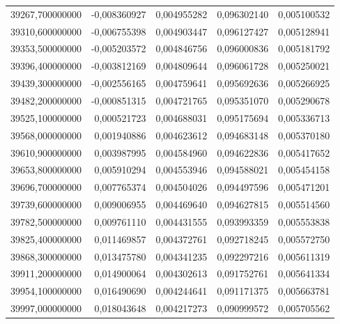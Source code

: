 \begin{longtable}{rrrrr}
39267,700000000 & -0,008360927 & 0,004955282 & 0,096302140 & 0,005100532\\
39310,600000000 & -0,006755398 & 0,004903447 & 0,096127427 & 0,005128941\\
39353,500000000 & -0,005203572 & 0,004846756 & 0,096000836 & 0,005181792\\
39396,400000000 & -0,003812169 & 0,004809644 & 0,096061728 & 0,005250021\\
39439,300000000 & -0,002556165 & 0,004759641 & 0,095692636 & 0,005266925\\
39482,200000000 & -0,000851315 & 0,004721765 & 0,095351070 & 0,005290678\\
39525,100000000 & 0,000521723 & 0,004688031 & 0,095175694 & 0,005336713\\
39568,000000000 & 0,001940886 & 0,004623612 & 0,094683148 & 0,005370180\\
39610,900000000 & 0,003987995 & 0,004584960 & 0,094622836 & 0,005417652\\
39653,800000000 & 0,005910294 & 0,004553946 & 0,094588021 & 0,005454158\\
39696,700000000 & 0,007765374 & 0,004504026 & 0,094497596 & 0,005471201\\
39739,600000000 & 0,009006955 & 0,004469640 & 0,094627815 & 0,005514560\\
39782,500000000 & 0,009761110 & 0,004431555 & 0,093993359 & 0,005553838\\
39825,400000000 & 0,011469857 & 0,004372761 & 0,092718245 & 0,005572750\\
39868,300000000 & 0,013475780 & 0,004341235 & 0,092297216 & 0,005611319\\
39911,200000000 & 0,014900064 & 0,004302613 & 0,091752761 & 0,005641334\\
39954,100000000 & 0,016490690 & 0,004244641 & 0,091171375 & 0,005663781\\
39997,000000000 & 0,018043648 & 0,004217273 & 0,090999572 & 0,005705562\\
\end{longtable}
